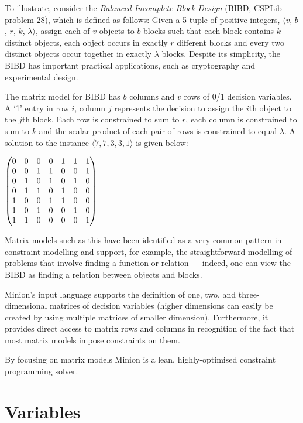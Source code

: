 \documentclass{article}
\begin{document}
\begin{small}
To illustrate, consider the {\em Balanced Incomplete Block Design}
(BIBD, CSPLib problem 28), which is defined as follows: Given a
5-tuple of positive integers, $\langle v$, $b$, $r$, $k$,
$\lambda\rangle$, assign each of $v$ objects to $b$ blocks such that
each block contains $k$ distinct objects, each object occurs in
exactly $r$ different blocks and every two distinct objects occur
together in exactly $\lambda$ blocks. Despite its simplicity, the BIBD
has important practical applications, such as cryptography and
experimental design.

The matrix model for BIBD has $b$ columns and $v$ rows of 0/1 decision
variables. A `1' entry in row $i$, column $j$ represents the decision
to assign the $i$th object to the $j$th block. Each row is constrained
to sum to $r$, each column is constrained to sum to $k$ and the scalar
product of each pair of rows is constrained to equal $\lambda$. A
solution to the instance $\langle 7, 7, 3, 3, 1\rangle$ is given
below:

$\begin{pmatrix}0&0&0&0&1&1&1\cr
         0&0&1&1&0&0&1\cr
         0&1&0&1&0&1&0\cr
         0&1&1&0&1&0&0\cr
         1&0&0&1&1&0&0\cr
         1&0&1&0&0&1&0\cr
         1&1&0&0&0&0&1\end{pmatrix}$

Matrix models such as this have been identified as a very common
pattern in constraint modelling and support, for example, the
straightforward modelling of problems that involve finding a function
or relation --- indeed, one can view the BIBD as finding a relation
between objects and blocks.

{\sc Minion}'s input language supports the definition of one, two, and
three-dimensional matrices of decision variables (higher dimensions
can easily be created by using multiple matrices of smaller
dimension).  Furthermore, it provides direct access to matrix rows and
columns in recognition of the fact that most matrix models impose
constraints on them.

By focusing on matrix models {\sc Minion} is a lean, highly-optimised
constraint programming solver.


\section{Variables}\label{sect_variables}


\end{small}
\end{document}
